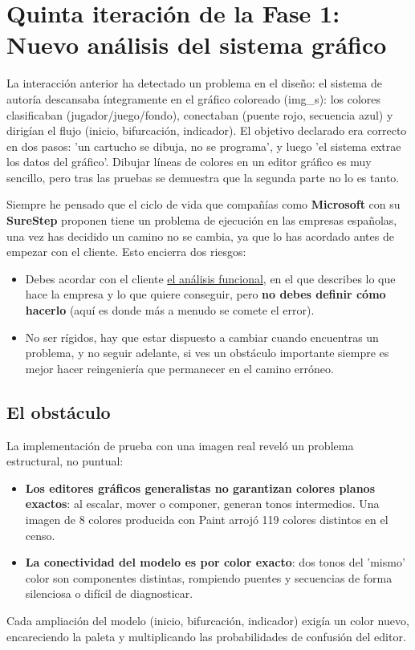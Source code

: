 \section{Quinta iteración de la Fase 1: Nuevo análisis del sistema gráfico}
\label{sec:NuevoAnalisisSistemaGráfico}

La interacción anterior ha detectado un problema en el diseño: el sistema de autoría descansaba íntegramente en el gráfico coloreado (img\_s): los colores clasificaban (jugador/juego/fondo), conectaban (puente rojo, secuencia azul) y dirigían el flujo (inicio, bifurcación, indicador). El objetivo declarado era correcto en dos pasos: 'un cartucho se dibuja, no se programa', y luego 'el sistema extrae los datos del gráfico'. Dibujar líneas de colores en un editor gráfico es muy sencillo, pero tras las pruebas se demuestra que la segunda parte no lo es tanto.

Siempre he pensado que el ciclo de vida que compañías como \textbf{Microsoft} con su \textbf{SureStep} proponen tiene un problema de ejecución en las empresas españolas, una vez has decidido un camino no se cambia, ya que lo has acordado antes de empezar con el cliente. Esto encierra dos riesgos:
\begin{itemize}
	\item Debes acordar con el cliente \underline{el análisis funcional}, en el que describes lo que hace la empresa y lo que quiere conseguir, pero \textbf{no debes definir cómo hacerlo} (aquí es donde más a menudo se comete el error).
	\item No ser rígidos, hay que estar dispuesto a cambiar cuando encuentras un problema, y no seguir adelante, si ves un obstáculo importante siempre es mejor hacer reingeniería que permanecer en el camino erróneo. 
\end{itemize}

\subsection{El obstáculo}
La implementación de prueba con una imagen real reveló un problema estructural, no puntual:
\begin{itemize}
	\item \textbf{Los editores gráficos generalistas no garantizan colores planos exactos}: al escalar, mover o componer, generan tonos intermedios. Una imagen de 8 colores producida con Paint arrojó 119 colores distintos en el censo.
	\item \textbf{La conectividad del modelo es por color exacto}: dos tonos del 'mismo' color son componentes distintas, rompiendo puentes y secuencias de forma silenciosa o difícil de diagnosticar.
\end{itemize}
Cada ampliación del modelo (inicio, bifurcación, indicador) exigía un color nuevo, encareciendo la paleta y multiplicando las probabilidades de confusión del editor.

